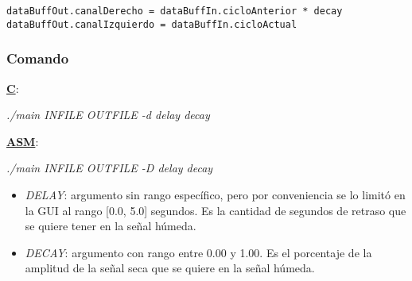 \lstset{language=C}
\begin{lstlisting}[frame=single]
dataBuffOut.canalDerecho = dataBuffIn.cicloAnterior * decay
dataBuffOut.canalIzquierdo = dataBuffIn.cicloActual
\end{lstlisting}

\subsubsection{Comando}
\label{subsec:desarrollo-delay-call}

\underline{\textbf{C}}:
\begin{center}
 \textit{./main INFILE OUTFILE -d delay decay}
\end{center}

\underline{\textbf{ASM}}:
\begin{center}
 \textit{./main INFILE OUTFILE -D delay decay}
\end{center}

\begin{itemize}
 \item \textit{DELAY}: argumento sin rango específico, pero por conveniencia se lo limitó en la GUI al rango [0.0, 5.0] segundos. Es la cantidad de segundos de retraso que se quiere tener en la señal húmeda.
 \item \textit{DECAY}: argumento con rango entre 0.00 y 1.00. Es el porcentaje de la amplitud de la señal seca que se quiere en la señal húmeda.
\end{itemize}

